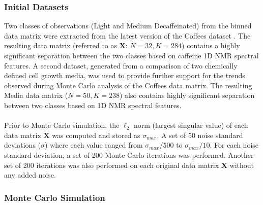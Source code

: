 \subsubsection{Initial Datasets}

\begin{doublespace}
Two classes of observations (Light and Medium Decaffeinated) from the binned
data matrix were extracted from the latest version of the Coffees
dataset \cite{worley:acscb2014}. The resulting data matrix (referred to as
$\mathbf{X}$: $N = 32, K = 284$) contains a highly significant separation
between the two classes based on caffeine 1D \hnmr{} NMR spectral features.
A second dataset, generated from a comparison of two chemically defined cell
growth media, was used to provide further support for the trends observed
during Monte Carlo analysis of the Coffees data matrix. The resulting Media
data matrix ($N = 50, K = 238$) also contains highly significant separation
between two classes based on 1D \hnmr{} NMR spectral features.
\\\\
Prior to Monte Carlo simulation, the $\ell_2$ norm (largest singular value) of
each data matrix $\mathbf{X}$ was computed and stored as $\sigma_{max}$. A set
of 50 noise standard deviations ($\sigma$) where each value ranged from
$\sigma_{max}/500$ to $\sigma_{max}/10$. For each noise standard deviation,
a set of 200 Monte Carlo iterations was performed. Another set of 200
iterations was also performed on each original data matrix $\mathbf{X}$ without
any added noise.
\end{doublespace}

\subsubsection{Monte Carlo Simulation}

